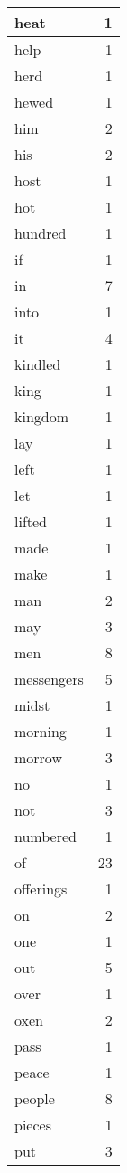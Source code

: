 \begin{center}
\begin{longtable}{l|r}
heat & 1 \\ \hline
help & 1 \\ \hline
herd & 1 \\ \hline
hewed & 1 \\ \hline
him & 2 \\ \hline
his & 2 \\ \hline
host & 1 \\ \hline
hot & 1 \\ \hline
hundred & 1 \\ \hline
if & 1 \\ \hline
in & 7 \\ \hline
into & 1 \\ \hline
it & 4 \\ \hline
kindled & 1 \\ \hline
king & 1 \\ \hline
kingdom & 1 \\ \hline
lay & 1 \\ \hline
left & 1 \\ \hline
let & 1 \\ \hline
lifted & 1 \\ \hline
made & 1 \\ \hline
make & 1 \\ \hline
man & 2 \\ \hline
may & 3 \\ \hline
men & 8 \\ \hline
messengers & 5 \\ \hline
midst & 1 \\ \hline
morning & 1 \\ \hline
morrow & 3 \\ \hline
no & 1 \\ \hline
not & 3 \\ \hline
numbered & 1 \\ \hline
of & 23 \\ \hline
offerings & 1 \\ \hline
on & 2 \\ \hline
one & 1 \\ \hline
out & 5 \\ \hline
over & 1 \\ \hline
oxen & 2 \\ \hline
pass & 1 \\ \hline
peace & 1 \\ \hline
people & 8 \\ \hline
pieces & 1 \\ \hline
put & 3 \\ \hline

\end{longtable}
\end{center}
